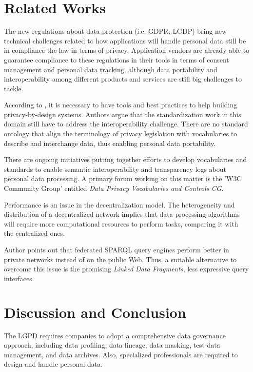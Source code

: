 \documentclass[sigconf]{acmart}
\begin{document}
\section{Related Works}

The new regulations about data protection (i.e. GDPR, LGDP) bring new technical challenges related to how applications will handle personal data still be in compliance the law in terms of privacy. Application vendors are already able to guarantee compliance to these regulations in their tools in terms of consent management and personal data tracking, although data portability and interoperability among different products and services are still big challenges to tackle.

According to \cite{bonatti2018data}, it is necessary to have tools and best practices to help building privacy-by-design systems\cite{cavoukian2009privacy}. Authors argue that the standardization work in this domain still have to address the interoperability challenge. There are no standard ontology that align the terminology of privacy legislation with vocabularies to describe and interchange data, thus enabling personal data portability.

There are ongoing initiatives putting together efforts to develop vocabularies and standards to enable semantic interoperability and transparency logs about personal data processing. A primary forum working on this matter is the 'W3C Community Group' entitled \textit{Data Privacy Vocabularies and Controls CG}.

Performance is an issue in the decentralization model\cite{verborgh_iswc_2018}. The heterogeneity and distribution of a decentralized network implies that data processing algorithms will require more computational resources to perform tasks, comparing it with the centralized ones.

Author points out that federated SPARQL query engines perform better in private networks instead of on the public Web. Thus, a suitable alternative to overcome this issue is the promising \linebreak \textit{Linked Data Fragments}\cite{LDF}, less expressive query interfaces.

\section{Discussion and Conclusion}

The LGPD requires companies to adopt a comprehensive data governance approach, including data profiling, data lineage, data masking, test-data management, and data archives. Also, specialized professionals are required to design and handle personal data.
\end{document}
